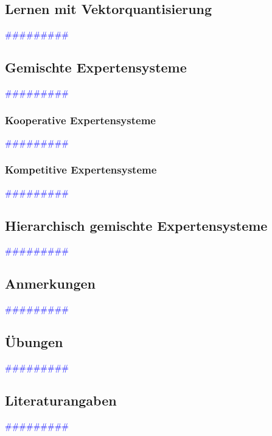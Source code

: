 \documentclass{article}
\begin{document}
  \subsection{Lernen mit Vektorquantisierung} %
      \textcolor{blue}{\#\#\#\#\#\#\#\#\#}
  \subsection{Gemischte Expertensysteme} %
      \textcolor{blue}{\#\#\#\#\#\#\#\#\#}
    \subsubsection{Kooperative Expertensysteme} %
      \textcolor{blue}{\#\#\#\#\#\#\#\#\#}
    \subsubsection{Kompetitive Expertensysteme} %
      \textcolor{blue}{\#\#\#\#\#\#\#\#\#}
  \subsection{Hierarchisch gemischte Expertensysteme} %
      \textcolor{blue}{\#\#\#\#\#\#\#\#\#}
  \subsection{Anmerkungen} %
      \textcolor{blue}{\#\#\#\#\#\#\#\#\#}
  \subsection{Übungen} %
      \textcolor{blue}{\#\#\#\#\#\#\#\#\#}
  \subsection{Literaturangaben} %
      \textcolor{blue}{\#\#\#\#\#\#\#\#\#}
\end{document}
